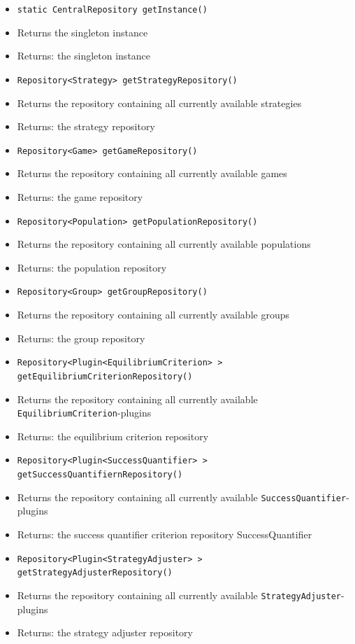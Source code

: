 \documentclass[parskip=full,11pt]{scrartcl}
\begin{document}
\begin{itemize} \itemsep -10pt
	\item \texttt{static CentralRepository getInstance()}
	\item[]Returns the singleton instance
	\item[] Returns: the singleton instance
	\item \texttt{Repository<Strategy> getStrategyRepository()}
	\item[]Returns the repository containing all currently available strategies
	\item[] Returns: the strategy repository
	\item \texttt{Repository<Game> getGameRepository()}
	\item[]Returns the repository containing all currently available games
	\item[] Returns: the game repository
	\item \texttt{Repository<Population> getPopulationRepository()}
	\item[]Returns the repository containing all currently available populations
	\item[] Returns: the population repository
	\item \texttt{Repository<Group> getGroupRepository()}
	\item[]Returns the repository containing all currently available groups
	\item[] Returns: the group repository
	\item \texttt{Repository<Plugin<EquilibriumCriterion>\,> getEquilibriumCriterionRepository()}
	\item[]Returns the repository containing all currently available \texttt{EquilibriumCriterion}-plugins
	\item[] Returns: the equilibrium criterion repository
	\item\texttt{Repository<Plugin<SuccessQuantifier>\,> getSuccessQuantifiernRepository()}
	\item[]Returns the repository containing all currently available \texttt{SuccessQuantifier}-plugins
	\item[] Returns: the success quantifier criterion repository
	SuccessQuantifier
	\item\texttt{Repository<Plugin<StrategyAdjuster>\,> getStrategyAdjusterRepository()}
	\item[]Returns the repository containing all currently available \texttt{StrategyAdjuster}-plugins
	\item[] Returns: the strategy adjuster repository

\end{itemize}
\end{document}
